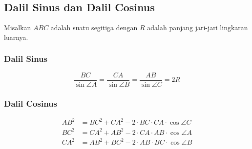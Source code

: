\subsection{Dalil Sinus dan Dalil Cosinus}
    Misalkan $ABC$ adalah suatu segitiga dengan $R$ adalah panjang jari-jari lingkaran luarnya.
\begin{center}
\end{center}
    \subsubsection{Dalil Sinus}
    $$\dfrac{BC}{\sin \angle A} = \dfrac{CA}{\sin \angle B}= \dfrac{AB}{\sin \angle C} = 2R$$
    
    \subsubsection{Dalil Cosinus}
    \begin{align*}
        AB^2 &= BC^2 + CA^2 - 2\cdot BC \cdot CA \cdot \cos \angle C\\
        BC^2 &= CA^2 + AB^2 - 2\cdot CA \cdot AB \cdot \cos \angle A\\
        CA^2 &= AB^2 + BC^2 - 2\cdot AB \cdot BC \cdot \cos \angle B
    \end{align*}

